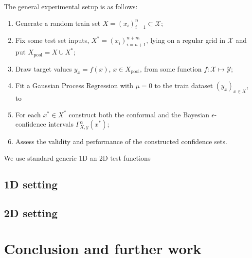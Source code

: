 \documentclass{ITaSconf}
\newcommand{\Xcal}{\mathcal{X}}
\newcommand{\Ycal}{\mathcal{Y}}
\begin{document}
The general experimental setup is as follows: \begin{enumerate}
  \item Generate a random train set $X = (x_i)_{i=1}^n\subset \Xcal$;
  \item Fix some test set inputs, $X^* = (x_i)_{i=n+1}^{n+m}$, lying on a regular
  grid in $\Xcal$ and put $X_{\text{pool}} = X \cup X^*$;
  \item Draw target values $y_x = f(x)$, $x\in X_{\text{pool}}$, from some
  function $f: \Xcal \mapsto \Ycal$;
  \item Fit a Gaussian Process Regression with $\mu=0$ to the train dataset
  $(y_x)_{x\in X}$, to 
  \item For each $x^*\in X^*$ construct both the conformal and the Bayesian $\epsilon$-
  confidence intervals $\Gamma_{X, y}^\alpha(x^*)$;
  \item Assess the validity and performance of the constructed confidence sets.
\end{enumerate}

We use standard generic 1D an 2D test functions 

\subsection{1D setting} %
\label{sub:1d_setting}


\subsection{2D setting} %
\label{sub:2d_setting}



\section{Conclusion and further work} %
\label{sec:conclusion_and_further_work}

\end{document}
